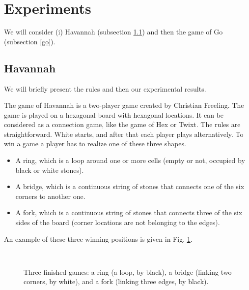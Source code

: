 \documentclass{llncs}
\begin{document}
\section{Experiments}\label{xp}

We will consider (i) Havannah (subsection \ref{hav}) and then the game of Go (subsection \ref{go}).

\subsection{Havannah}\label{hav}

We will briefly present the rules and then our experimental results.

The game of Havannah is a two-player game created by Christian Freeling. The game is played on a hexagonal board with hexagonal locations. It can be considered as a connection game, like the game of Hex or Twixt. 
The rules are straightforward. White starts, and after that each player plays alternatively. To win a game a player has to realize one of these three shapes.
\begin{itemize}
\item A ring, which is a loop around one or more cells (empty or not, occupied by black or white stones).
\item A bridge, which is a continuous string of stones that connects one of the six corners to another one.
\item A fork, which is a continuous string of stones that connects three of the six sides of the board (corner locations are not belonging to the edges).
\end{itemize}

An example of these three winning positions is given in Fig. \ref{laFigQuiDitTout}.

\begin{center}
\begin{figure}
\centering {}\ \ 
\caption{\label{laFigQuiDitTout}Three finished games: a ring (a loop, by black), a bridge (linking two corners, by white), and a fork (linking three edges, by black).}
\end{figure}
\end{center}
\end{document}
